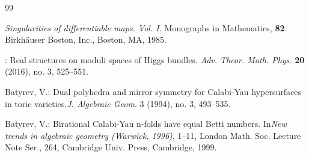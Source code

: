 \begin{thebibliography}{99}







	
	{\em	Singularities of differentiable maps. Vol. I.}
	Monographs in Mathematics, {\bf 82}. Birkh\"auser Boston, Inc., Boston, MA, 1985.
	
	:
	Real structures on moduli spaces of Higgs bundles. {\em 
		Adv. Theor. Math. Phys.} {\bf 20} (2016), no. 3, 525--551.
	
	 Batyrev, V.: Dual polyhedra and mirror symmetry for Calabi-Yau hypersurfaces in toric varieties.{\em J. Algebraic Geom}. 3 (1994), no. 3, 493–535.
	
	 Batyrev, V.: Birational Calabi-Yau n-folds have equal Betti numbers. In{\em New trends in algebraic geometry (Warwick, 1996)}, 1--11,
London Math. Soc. Lecture Note Ser., 264, Cambridge Univ. Press, Cambridge, 1999.
	

\end{thebibliography}
